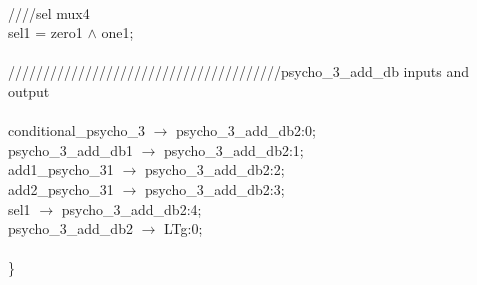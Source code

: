    \\
   \hspace*{2em}////sel mux4 \\
   \hspace*{2em}sel1 = zero1 $\wedge$ one1; \\
   \\
   \hspace*{2em}///////////////////////////////////////psycho\_3\_add\_db inputs and output \\
   \\
   \hspace*{2em}conditional\_psycho\_3 $\rightarrow$ psycho\_3\_add\_db2:0; \\
   \hspace*{2em}psycho\_3\_add\_db1 $\rightarrow$ psycho\_3\_add\_db2:1; \\
   \hspace*{2em}add1\_psycho\_31 $\rightarrow$ psycho\_3\_add\_db2:2; \\
   \hspace*{2em}add2\_psycho\_31 $\rightarrow$ psycho\_3\_add\_db2:3; \\
   \hspace*{2em}sel1 $\rightarrow$ psycho\_3\_add\_db2:4; \\
   \hspace*{2em}psycho\_3\_add\_db2 $\rightarrow$ LTg:0; \\
   \\
\} \\